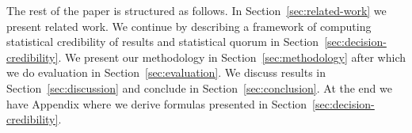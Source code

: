 \documentclass[chi_draft]{sigchi}
\begin{document}
The rest of the paper is structured as follows. In Section~\ref{sec:related-work} we
present related work. We continue by describing a framework of computing statistical
credibility of results and statistical quorum in Section~\ref{sec:decision-credibility}.
We present our methodology in Section~\ref{sec:methodology} after which we do evaluation in
Section~\ref{sec:evaluation}. We discuss results in Section~\ref{sec:discussion} and conclude
in Section~\ref{sec:conclusion}. At the end we have Appendix where we
derive formulas presented in Section~\ref{sec:decision-credibility}.

%
%
%
%
\end{document}

